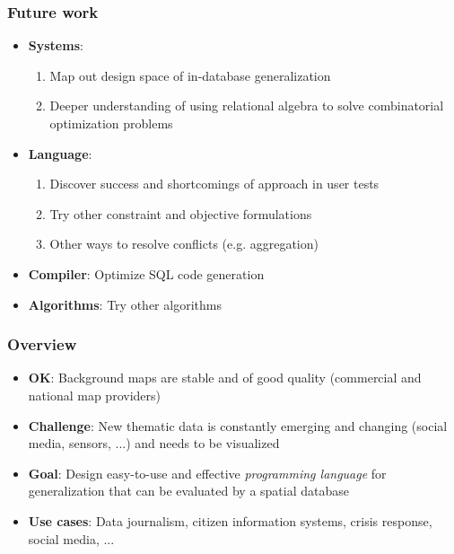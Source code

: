 \documentclass{beamer}
\begin{document}

\frame
{
  \frametitle{Future work}
  \begin{itemize}
  \item \textbf{Systems}: 
  \begin{enumerate}
    \item Map out design space of in-database generalization
    \item Deeper understanding of using relational algebra to solve combinatorial optimization problems
  \end{enumerate}
  \item \textbf{Language}: 
  \begin{enumerate}
  	\item Discover success and shortcomings of approach in user tests
  	\item Try other constraint and objective formulations
  	\item Other ways to resolve conflicts (e.g. aggregation)
  \end{enumerate}
  \item \textbf{Compiler}: Optimize SQL code generation
  \item \textbf{Algorithms}: Try other algorithms
  \end{itemize}
  \begin{center}
  \end{center}
}



\frame
{
  \frametitle{Overview}
  \begin{center}
  \end{center}
  
  \begin{itemize}
  \item \textbf{OK}: Background maps are stable and of good quality (commercial and national map providers)
  \item \textbf{Challenge}: New thematic data is constantly emerging and changing (social media, sensors, ...) and needs to be visualized
  \item \textbf{Goal}: Design easy-to-use and effective \emph{programming language} for generalization that can be evaluated by a spatial database  \item \textbf{Use cases}: Data journalism, citizen information systems, crisis response, social media, ...
  \end{itemize}
}
\end{document}
